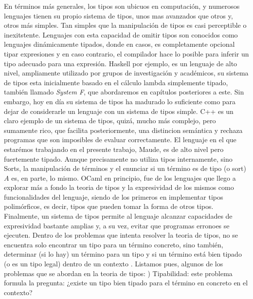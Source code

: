 \newline
\newline
\indent En términos más generales, los tipos son ubicuos en computación, y numerosos lenguajes tienen su propio sistema de tipos, unos mas avanzados que otros y, otros más simples. Tan simples que la manipulación de tipos es casi perceptible o inexitstente. Lenguajes con esta capacidad de omitir tipos son conocidos como lenguajes dinámicamente tipados, donde en casos, es completamente opcional tipar expresiones y en caso contrario, el compilador hace lo posible para inferir un tipo adecuado para una expresión. Haskell por ejemplo, es un lenguaje de alto nivel, ampliamente utilizado por grupos de investigación y académicos, su sistema de tipos esta inicialmente basado en el cálculo lambda simplemente tipado, también llamado \textit{System F}, que abordaremos en capítulos posteriores a este. Sin embargo, hoy en día su sistema de tipos ha madurado lo suficiente como para dejar de considerarle un lenguaje con un sistema de tipos simple. C++ es un claro ejemplo de un sistema de tipos, quizá, mucho más complejo, pero sumamente rico, que facilita posteriormente, una distincion semántica y rechaza programas que son imposibles de evaluar correctamente. El lenguaje en el que estarémos trabajando en el presente trabajo, Maude, es de alto nivel pero fuertemente tipado. Aunque precisamente no utiliza tipos internamente, sino Sorts, la manipulación de términos y el enunciar si un término es de tipo (o sort) $A$ es, en parte, lo mismo.  OCaml en principio, fue de los lenguajes que llego a explorar más a fondo la teoria de tipos y la expresividad de los mismos como funcionalidades del lenguaje, siendo de los primeros en implementar tipos polimórficos, es decir, tipos que pueden tomar la forma de otros tipos. Finalmente, un sistema de tipos permite al lenguaje alcanzar capacidades de expresividad bastante amplias y, a su vez, evitar que programas erronoes se ejecuten.
\newline
\newline
\indent Dentro de los problemas que intenta resolver la teoria de tipos, no se encuentra solo encontrar un tipo para un término concreto, sino también, determinar (si lo hay) un término para un tipo y si un término está bien tipado (o es un tipo legal) dentro de un contexto \citep{geuvers2014}. Listamos pues, algunos de los problemas que se abordan en la teoria de tipos:
\newline
{}) Tipabilidad: este problema formula la pregunta: ¿existe un tipo bien tipado para el término en concreto en el contexto?

